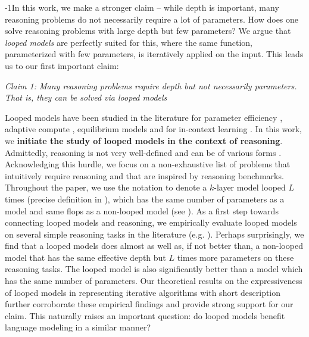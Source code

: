 \looseness-1In this work, we make a stronger claim -- while depth is important, many reasoning problems do not necessarily require a lot of parameters. How does one solve reasoning problems with large depth but few parameters? We argue that {\em looped models} are perfectly suited for this, where the same function, parameterized with few parameters, is iteratively applied on the input. This leads us to our first important claim:
\vspace{-0.05in}
\begin{center}
    \textit{Claim 1: Many reasoning problems require depth but not necessarily parameters. That is, they can be solved via looped models}
\end{center}
\vspace{-0.05in}
Looped models have been studied in the literature for parameter efficiency \citep{lan2019albert}, adaptive compute \citep{dehghani2018universal}, equilibrium models \citep{bai2019deep} and for in-context learning \citep{yang2023looped,gatmiry2024can}.
In this work, we {\bf initiate the study of looped models in the context of reasoning}. Admittedly, reasoning is not very well-defined and can be of various forms \citep{sun2023survey}. Acknowledging this hurdle, we focus on a non-exhaustive list of problems that intuitively require reasoning and that are inspired by reasoning benchmarks.
Throughout the paper, we use the notation  to denote a $k$-layer model looped $L$ times (precise definition in ), which has the same number of parameters as a  model and same flops as a  non-looped model (see ). 
As a first step towards connecting looped models and reasoning, we empirically evaluate looped models on several simple reasoning tasks in the literature (e.g. ). Perhaps surprisingly,  we find that a  looped models does almost as well as, if not better than, a non-looped model  that has the same effective depth but $L$ times more parameters on these reasoning tasks. The looped model is also significantly better than a  model which has the same number of parameters. Our theoretical results on the expressiveness of looped models in representing iterative algorithms with short description further corroborate these empirical findings and provide strong support for our claim. This naturally raises an important question: do looped models benefit language modeling in a similar manner?



